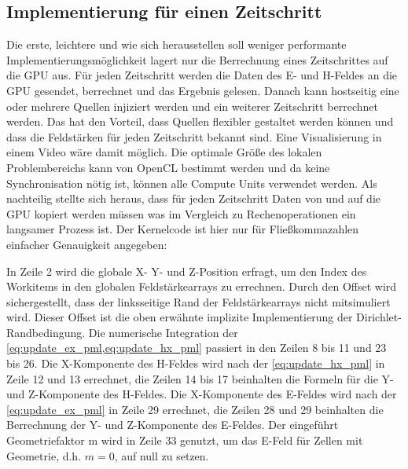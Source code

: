 \documentclass[11pt, ngerman]{article}
\begin{document}
\subsection{Implementierung f\"ur einen Zeitschritt}
Die erste, leichtere und wie sich herausstellen soll weniger performante Implementierungsm\"oglichkeit
lagert nur die Berrechnung eines Zeitschrittes auf die GPU aus. F\"ur jeden Zeitschritt werden
die Daten des E- und H-Feldes an die GPU gesendet, berrechnet und das Ergebnis gelesen.
Danach kann hostseitig eine oder mehrere Quellen injiziert werden und ein weiterer Zeitschritt berrechnet werden.
Das hat den Vorteil, dass Quellen flexibler gestaltet werden k\"onnen und dass die Feldst\"arken f\"ur jeden
Zeitschritt bekannt sind. Eine Visualisierung in einem Video w\"are damit m\"oglich.
Die optimale Gr\"o{\ss}e des lokalen Problembereichs kann von OpenCL bestimmt werden und da keine
Synchronisation n\"otig ist, k\"onnen alle Compute Units verwendet werden.
Als nachteilig stellte sich heraus, dass f\"ur jeden Zeitschritt Daten von und auf die GPU kopiert werden m\"ussen was 
im Vergleich zu Rechenoperationen ein langsamer Prozess ist.
Der Kernelcode ist hier nur f\"ur Flie{\ss}kommazahlen einfacher Genauigkeit angegeben:


In Zeile 2 wird die globale X- Y- und Z-Position erfragt, um den Index des Workitems in den
globalen Feldst\"arkearrays zu errechnen. Durch den Offset wird sichergestellt, dass
der linksseitige Rand der Feldst\"arkearrays nicht mitsimuliert wird. Dieser Offset ist
die oben erw\"ahnte implizite Implementierung der Dirichlet-Randbedingung.
Die numerische Integration der \cref{eq:update_ex_pml,eq:update_hx_pml}
passiert in den Zeilen 8 bis 11 und 23 bis 26.
Die X-Komponente des H-Feldes wird nach der \cref{eq:update_hx_pml} in Zeile 12 und 13 errechnet,
die Zeilen 14 bis 17 beinhalten die Formeln f\"ur die Y- und Z-Komponente des H-Feldes.
Die X-Komponente des E-Feldes wird nach der \cref{eq:update_ex_pml} in Zeile 29 errechnet,
die Zeilen 28 und 29 beinhalten die Berrechnung der Y- und Z-Komponente des E-Feldes.
Der eingef\"uhrt Geometriefaktor m wird in Zeile 33 genutzt, um das E-Feld f\"ur Zellen mit
Geometrie, d.h. \(m = 0\), auf null zu setzen.
\end{document}
